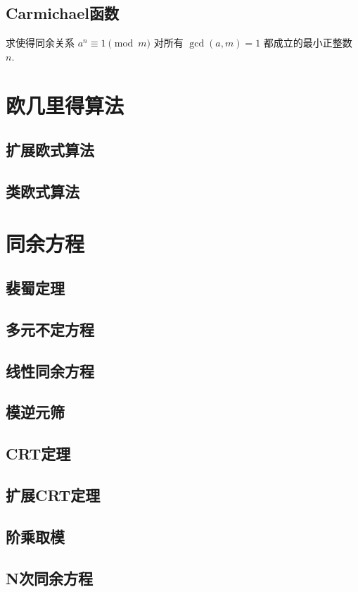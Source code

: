 \documentclass[12pt,a4paper]{article}
\begin{document}
\newpage
\subsection{Carmichael函数}
\begin{mdframed}[leftline=true, linewidth=2pt, linecolor=gray]
	求使得同余关系 $a^n\equiv 1\pmod{m}$ 对所有 $\gcd(a,m)=1$ 都成立的最小正整数 $n$. 
\end{mdframed}

\newpage
\section{欧几里得算法}
\subsection{扩展欧式算法} %
\subsection{类欧式算法}

\newpage
\section{同余方程}
\subsection{裴蜀定理}
\subsection{多元不定方程}
\subsection{线性同余方程}
\subsection{模逆元筛}
\subsection{CRT定理}
\subsection{扩展CRT定理}
\subsection{阶乘取模}
\subsection{N次同余方程}
\end{document}
